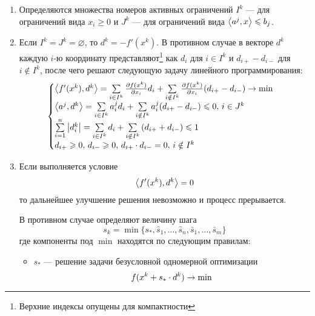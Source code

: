 \begin{enumerate}
  \renewcommand{\labelenumi}{\textbf{Шаг \arabic{enumi}.}}
\item Определяются множества номеров активных ограничений $I^k$ — для
  ограничений вида $x_i \geq 0$ и $J^k$ — для ограничений вида
  ${\left \langle a^j,x \right \rangle} \leqslant b_j$.
\item Если $I^k=J^k = \varnothing$, то $d^k=-f'(x^k)$. В противном
  случае в векторе $d^k$ каждую $i$-ю координату
  представляют\footnote{Верхние индексы опущены для компактности} как
  $d_i$ для $i \in I^k$ и $d_{i+}-d_{i-}$ для $i \notin I^k$, после
  чего решают следующую задачу линейного программирования:
  \begin{equation}
    \label{eq:zoutendijk-linprog}
    \begin{cases}
      {\left \langle f'(x^k), d^k \right \rangle} = 
      \sum\limits_{i\in I^k}{\frac{\partial{f(x^k)}}{\partial{x_i}}d_i} + 
      \sum\limits_{i \notin I^k}{\frac{\partial{f(x^k)}}{\partial{x_i}}(d_{i+}-d_{i-})}
      \to \min\\
      
      {\left \langle a^j, d^k \right \rangle} = 
      \sum\limits_{i\in I^k}{a^j_id_i} +
      \sum\limits_{i \notin I^k}{a^j_i(d_{i+}-d_{i-})} \leqslant 0,
      \, i\in J^k \\
      
      \sum\limits_{i=1}^n\left \lvert{d_i^k}\right \rvert = \sum\limits_{i\in I^k}{d_i}+
      \sum\limits_{i \notin I^k}{\left( d_{i+} + d_{i-}\right)} \leqslant 1\\
      
      d_{i+} \geqslant 0,\, d_{i-} \geqslant 0,\,d_{i+}\cdot d_{i-}=0,\, i\notin I^k
    \end{cases}
  \end{equation}
\item Если выполняется условие
  \begin{equation}
    \label{eq:zoutendijk-halt}
    {\left \langle f'(x^k), d^k \right \rangle} = 0
  \end{equation}
  то дальнейшее улучшение решения невозможно и процесс прерывается.

  В противном случае определяют величину шага
  \begin{equation}
    \label{eq:zoutendijk-step}
    s_k =
    \min\{s_*,\hat{s}_1,\dotsc,\hat{s}_n,\bar{s}_1,\dotsc,\bar{s}_m\}
  \end{equation}
  где компоненты под $\min$ находятся по следующим правилам:
  \begin{itemize}
  \item $s_*$ — решение задачи безусловной одномерной оптимизации
    \begin{equation*} 
      f(x^k+s_* \cdot d^k) \to \min
    \end{equation*}


\end{itemize}
\end{enumerate}
